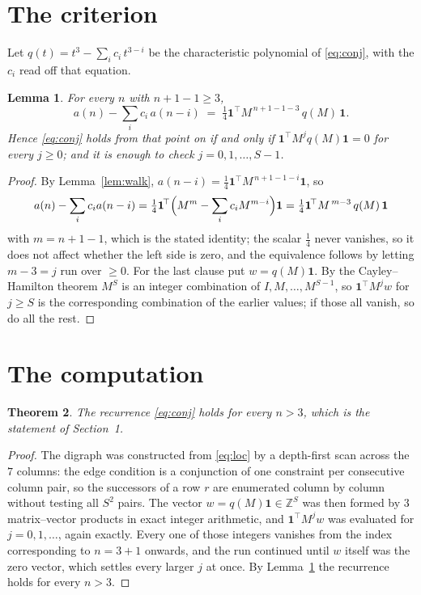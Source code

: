 \documentclass[11pt,a4paper]{article}
\theoremstyle{plain}
\newtheorem{theorem}{Theorem}
\newtheorem{lemma}[theorem]{Lemma}
\theoremstyle{definition}
\begin{document}
\section{The criterion}

Let $q(t)=t^{3}-\sum_i c_i\,t^{3-i}$ be the characteristic polynomial of
\eqref{eq:conj}, with the $c_i$ read off that equation.

\begin{lemma}\label{lem:crit}
For every $n$ with $n+1-1\ge3$,
\[
a(n)-\sum_i c_i\,a(n-i)\;=\;\tfrac1{4}\mathbf{1}^{\!\top}M^{\,n+1-1-3}\,q(M)\,\mathbf{1} .
\]
Hence \eqref{eq:conj} holds from that point on if and only if
$\mathbf{1}^{\!\top}M^{j}q(M)\mathbf{1}=0$ for every $j\ge0$; and it is enough to check
$j=0,1,\dots,S-1$.
\end{lemma}

\begin{proof}
By Lemma~\ref{lem:walk}, $a(n-i)=\tfrac1{4}\mathbf{1}^{\!\top}M^{\,n+1-1-i}\mathbf{1}$, so
\[
a(n)-\sum_i c_i a(n-i)
=\tfrac1{4}\mathbf{1}^{\!\top}\Bigl(M^{m}-\sum_i c_i M^{m-i}\Bigr)\mathbf{1}
=\tfrac1{4}\mathbf{1}^{\!\top}M^{\,m-3}\,q(M)\,\mathbf{1}
\]
with $m=n+1-1$, which is the stated identity; the scalar $\tfrac1{4}$ never vanishes, so it does not affect whether the left side is zero, and the equivalence follows by letting
$m-3=j$ run over $\ge0$. For the last clause put $w=q(M)\mathbf{1}$. By the
Cayley--Hamilton theorem $M^{S}$ is an integer combination of $I,M,\dots,M^{S-1}$, so
$\mathbf{1}^{\!\top}M^{j}w$ for $j\ge S$ is the corresponding combination of the earlier
values; if those all vanish, so do all the rest.
\end{proof}

\section{The computation}

\begin{theorem}
The recurrence \eqref{eq:conj} holds for every $n>3$, which is the statement of
Section~1.
\end{theorem}

\begin{proof}
The digraph was constructed from \eqref{eq:loc} by a depth-first scan across the $7$
columns: the edge condition is a conjunction of one constraint per consecutive column
pair, so the successors of a row $r$ are enumerated column by column without testing all
$S^2$ pairs. The vector $w=q(M)\mathbf{1}\in\mathbb{Z}^{S}$ was then formed by $3$
matrix--vector products in exact integer arithmetic, and $\mathbf{1}^{\!\top}M^{j}w$ was
evaluated for $j=0,1,\dots$, again exactly. Every one of those integers vanishes from the
index corresponding to $n=3+1$ onwards, and the run continued until $w$ itself was the
zero vector, which settles every larger $j$ at once. By Lemma~\ref{lem:crit} the recurrence
holds for every $n>3$.
\end{proof}
\end{document}
